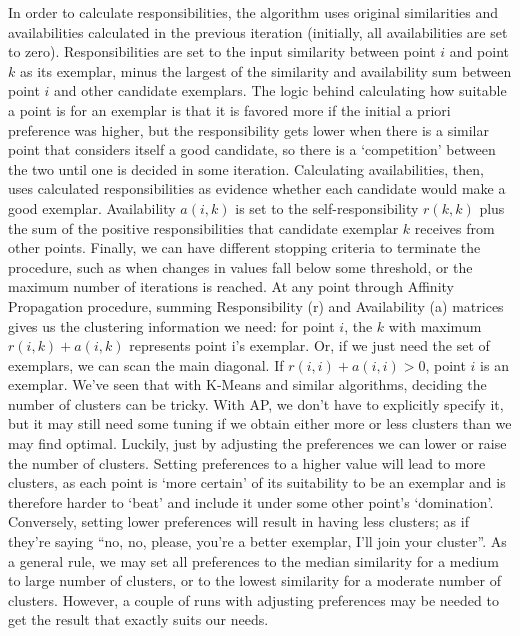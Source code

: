 \documentclass[a4paper, 12pt]{article}
\begin{document}
In order to calculate responsibilities, the algorithm uses original similarities and availabilities calculated in the previous iteration (initially, all availabilities are set to zero). Responsibilities are set to the input similarity between point $i$ and point $k$ as its exemplar, minus the largest of the similarity and availability sum between point $i$ and other candidate exemplars. The logic behind calculating how suitable a point is for an exemplar is that it is favored more if the initial a priori preference was higher, but the responsibility gets lower when there is a similar point that considers itself a good candidate, so there is a ‘competition’ between the two until one is decided in some iteration.
Calculating availabilities, then, uses calculated responsibilities as evidence whether each candidate would make a good exemplar. Availability $a(i, k)$ is set to the self-responsibility $r(k, k)$ plus the sum of the positive responsibilities that candidate exemplar $k$ receives from other points.
Finally, we can have different stopping criteria to terminate the procedure, such as when changes in values fall below some threshold, or the maximum number of iterations is reached. At any point through Affinity Propagation procedure, summing Responsibility (r) and Availability (a) matrices gives us the clustering information we need: for point $i$, the $k$ with maximum $r(i, k) + a(i, k)$ represents point i’s exemplar. Or, if we just need the set of exemplars, we can scan the main diagonal. If $r(i, i) + a(i, i) > 0$, point $i$ is an exemplar.
We’ve seen that with K-Means and similar algorithms, deciding the number of clusters can be tricky. With AP, we don’t have to explicitly specify it, but it may still need some tuning if we obtain either more or less clusters than we may find optimal. Luckily, just by adjusting the preferences we can lower or raise the number of clusters. Setting preferences to a higher value will lead to more clusters, as each point is ‘more certain’ of its suitability to be an exemplar and is therefore harder to ‘beat’ and include it under some other point’s ‘domination’. Conversely, setting lower preferences will result in having less clusters; as if they’re saying “no, no, please, you’re a better exemplar, I’ll join your cluster”. As a general rule, we may set all preferences to the median similarity for a medium to large number of clusters, or to the lowest similarity for a moderate number of clusters. However, a couple of runs with adjusting preferences may be needed to get the result that exactly suits our needs.
\end{document}
